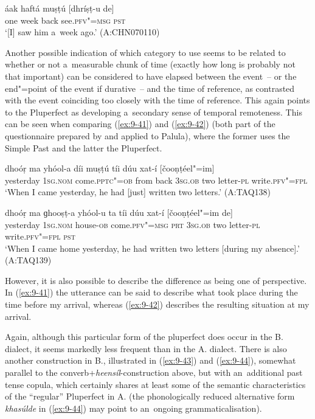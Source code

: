 \begin{exe}
\ex
\label{ex:9-40}
\gll áak haftá muṣṭú [dhríṣṭ-u de]  \\
one week back see.\textsc{pfv"=msg} \textsc{pst} \\
\glt `[I] saw him a~week ago.' (A:CHN070110)
\end{exe}

Another possible indication of which category to use seems to be related to whether or not a~measurable chunk of time (exactly how long is probably not that important) can be considered to have elapsed between the event~-- or the end"=point of the event if durative~-- and the time of reference, as contrasted with the event coinciding too closely with the time of reference. This again points to the Pluperfect as developing a~secondary sense of temporal remoteness. This can be seen when comparing (\ref{ex:9-41}) and (\ref{ex:9-42}) (both part of the questionnaire prepared by \citet{dahl1985} and applied to Palula), where the former uses the Simple Past and the latter the Pluperfect.

\begin{exe}
\ex
\label{ex:9-41}
\gll \label{bkm:Ref190742986}dhoóṛ ma yhóol-a díi muṣṭú tíi dúu xat-í [čooṇṭéel"=im] \\
yesterday 1\textsc{sg.nom} come.\textsc{pptc"=ob} from back \textsc{3sg.ob} two letter-\textsc{pl} write.\textsc{pfv"=fpl} \\
\glt `When I came yesterday, he had [just] written two letters.' (A:TAQ138)

\ex
\label{ex:9-42}
\gll dhoóṛ ma ɡhooṣṭ-a yhóol-u ta tíi dúu xat-í [čooṇṭéel"=im de] \\
yesterday 1\textsc{sg.nom} house-\textsc{ob} come.\textsc{pfv"=msg}  \textsc{prt} \textsc{3sg.ob} two letter-\textsc{pl} write.\textsc{pfv"=fpl} \textsc{pst} \\
\glt `When I came home yesterday, he had written two letters [during my absence].' (A:TAQ139)
\end{exe}

However, it is also possible to describe the difference as being one of perspective. In (\ref{ex:9-41}) the utterance can be said to describe what took place during the time before my arrival, whereas (\ref{ex:9-42}) describes the resulting situation at my arrival.


Again, although this particular form of the pluperfect does occur in the B. dialect, it seems markedly less frequent than in the A. dialect. There is also another construction in B., illustrated in (\ref{ex:9-43}) and (\ref{ex:9-44}), somewhat parallel to the converb+\textit{heensíl}-construction above, but with an~additional past tense copula, which certainly shares at least some of the semantic characteristics of the ``regular'' Pluperfect in A. (the phonologically reduced alternative form \textit{khasúlde} in (\ref{ex:9-44}) may point to an~ongoing grammaticalisation).

